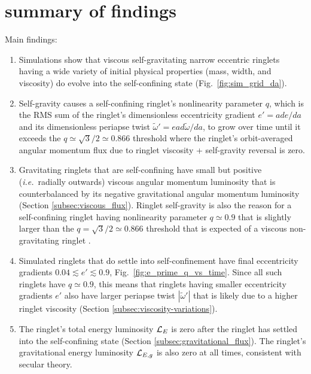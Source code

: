 \documentclass[preprint]{aastex62}
\begin{document}
\section{summary of findings}
\label{sec:summary}

Main findings:

\begin{enumerate}

\item Simulations show that viscous self-gravitating
narrow eccentric ringlets having a wide variety of initial 
physical properties (mass, width, and viscosity) do evolve
into the self-confining state (Fig.\ \ref{fig:sim_grid_da}).

\item Self-gravity causes a self-confining ringlet's nonlinearity parameter $q$, 
which is the RMS sum of the ringlet's dimensionless eccentricity gradient $e'=ade/da$ 
and its dimensionless periapse twist $\tilde{\omega}' = ead\tilde{\omega}/da$,
to grow over time until it exceeds the $q\simeq\sqrt{3}/2\simeq0.866$ threshold where 
the ringlet's orbit-averaged angular momentum flux due to ringlet viscosity + self-gravity reversal is zero.

\item Gravitating ringlets that are self-confining have small but positive 
({\it i.e.}\ radially outwards) viscous angular momentum luminosity
that is counterbalanced by its negative gravitational angular momentum luminosity
(Section \ref{subsec:viscous_flux}). Ringlet self-gravity is also the reason
for a self-confining ringlet having nonlinearity parameter $q\simeq0.9$
that is slightly larger than the $q = \sqrt{3}/2 \simeq 0.866$
threshold that is expected of a viscous non-gravitating ringlet
\citep{BGT82}.

\item Simulated ringlets that do settle into self-confinement have final eccentricity
gradients $0.04\lesssim e' \lesssim 0.9$, Fig.\ \ref{fig:e_prime_q_vs_time}. Since all such ringlets 
have $q\simeq0.9$, this means that ringlets having smaller eccentricity gradients $e'$
also have larger periapse twist $|\tilde{\omega}'|$ that is likely due to a higher 
ringlet viscosity (Section \ref{subsec:viscosity-variations}).

\item The ringlet's total energy luminosity ${\cal L}_{E}$ is zero after the ringlet has settled into
the self-confining state (Section \ref{subsec:gravitational_flux}). 
The ringlet's gravitational energy luminosity ${\cal L}_{E,g}$ is also
zero at all times, consistent with secular theory. 


\end{enumerate}
\end{document}
